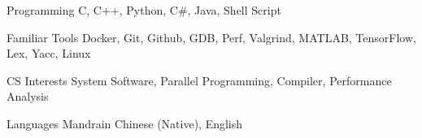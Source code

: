 

\begin{cvskills}

  \cvskill
    {Programming} %
    {C, C++, Python, C\#, Java, Shell Script} %

  \cvskill
    {Familiar Tools} %
    {Docker, Git, Github, GDB, Perf, Valgrind, MATLAB, TensorFlow, Lex, Yacc, Linux} %

  \cvskill
    {CS Interests} %
    {System Software, Parallel Programming, Compiler, Performance Analysis} %

  \cvskill
    {Languages} %
    {Mandrain Chinese (Native), English} %

\end{cvskills}
